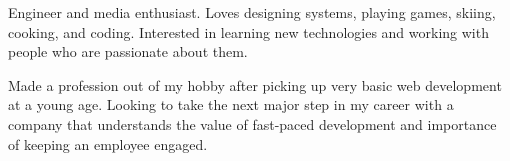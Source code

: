

\begin{cvparagraph}

Engineer and media enthusiast. Loves designing systems, playing games, skiing, cooking, and coding. Interested in learning new technologies and working with people who are passionate about them.

Made a profession out of my hobby after picking up very basic web development at a young age.
Looking to take the next major step in my career with a company that understands the value of fast-paced development and importance of keeping an employee engaged.
\end{cvparagraph}
